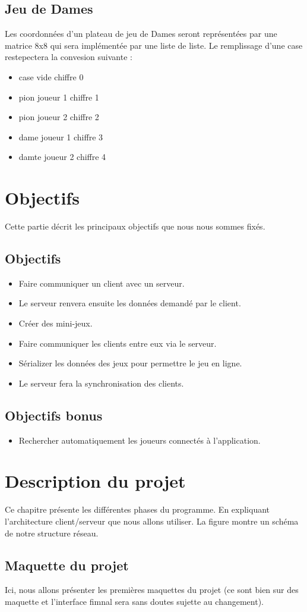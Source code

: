 \documentclass{report}
\begin{document}
\section{Jeu de Dames}
Les coordonnées d'un plateau de jeu de Dames seront représentées par une matrice 8x8 qui sera implémentée par une liste de liste.
Le remplissage d'une case restepectera la convesion suivante :
\begin{itemize}
	\item case vide \tabto{4cm} chiffre 0
	\item pion joueur 1 \tabto{4cm} chiffre 1
	\item pion joueur 2  \tabto{4cm} chiffre 2
	\item dame joueur 1 \tabto{4cm} chiffre 3
	\item damte joueur 2 \tabto{4cm} chiffre 4
\end{itemize}

\chapter{Objectifs}
Cette partie décrit les principaux objectifs que nous nous sommes fixés.
\section{Objectifs}\label{objectifs}
\begin{itemize}
	\item Faire communiquer un client avec un serveur.
	\item Le serveur renvera ensuite les données demandé par le client.
	\item Créer des mini-jeux.
	\item Faire communiquer les clients entre eux via le serveur.
	\item Sérializer les données des jeux pour permettre le jeu en ligne.
	\item Le serveur fera la synchronisation des clients.
\end{itemize}
\section{Objectifs bonus}\label{objectifs-bonus}
\begin{itemize}
	\item Rechercher automatiquement les joueurs connectés à l'application.
\end{itemize}
\chapter{Description du projet}\label{desciption-projet}
Ce chapitre présente les différentes phases du programme. En expliquant l'architecture client/serveur que nous allons utiliser. La figure montre un schéma de notre
structure réseau.
\section{Maquette du projet}\label{maquette}
Ici, nous allons présenter les premières maquettes du projet (ce sont bien sur des maquette et l'interface fimnal sera sans doutes sujette au changement).
\end{document}
